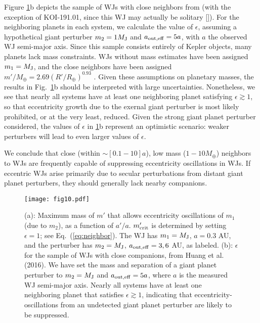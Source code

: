 \documentclass[12pt,useAMS, usenatbib]{mn2e}
\newcommand{\aouteff}{a_{\rm out,eff}}
\newcommand{\mjup}{M_{\rm J}}
\begin{document}
Figure \ref{fig:neighbor}b depicts the sample of WJs with close neighbors from \cite{huang2016} (with the exception of KOI-191.01, since this WJ may actually be solitary [\citealt{law2014}]).  For the neighboring planets in each system, we calculate the value of $\epsilon$, assuming a hypothetical giant perturber $m_2 = 1 \mjup$ and $\aouteff = 5 a$, with $a$ the observed WJ semi-major axis.  Since this sample consists entirely of Kepler objects, many planets lack mass constraints.  WJs without mass estimates have been assigned $m_1 = \mjup$, and the close neighbors have been assigned $m'/M_{\oplus} = 2.69 (R'/R_{\oplus})^{0.93}$ \citep{weiss2014}.  Given these assumptions on planetary masses, the results in Fig.~\ref{fig:neighbor}b should be interpreted with large uncertainties.  Nonetheless, we see that nearly all systems have at least one neighboring planet satisfying $\epsilon \gtrsim 1$, so that eccentricity growth due to the exernal giant perturber is most likely prohibited, or at the very least, reduced.  Given the strong giant planet perturber considered, the values of $\epsilon$ in \ref{fig:neighbor}b represent an optimistic scenario: weaker perturbers will lead to even larger values of $\epsilon$.

We conclude that close (within $\sim [0.1 - 10] a$), low mass ($1-10 M_{\oplus}$) neighbors to WJs are frequently capable of suppressing eccentricity oscillations in WJs.  If eccentric WJs arise primarily due to secular perturbations from distant giant planet perturbers, they should generally lack nearby companions.

\begin{figure*}
\centering 
\texttt{[image: fig10.pdf]}
\caption{(a): Maximum mass of $m'$ that allows eccentricity oscillations of $m_1$ (due to $m_2$), as a function of $a'/a$.  $m_{\rm crit}'$ is determined by setting $\epsilon = 1$; see Eq.~(\ref{eq:neighbor}).   The WJ has $m_1 = \mjup$, $a = 0.3$ AU, and the perturber has $m_2 = \mjup$, $\aouteff = 3, 6$ AU, as labeled. (b):  $\epsilon$ for the sample of WJs with close companions, from Huang et al. (2016).  We have set the mass and separation of a giant planet perturber to $m_2 = \mjup$ and $\aouteff = 5 a$, where $a$ is the measured WJ semi-major axis.  Nearly all systems have at least one neighboring planet that satisfies $\epsilon \gtrsim 1$, indicating that eccentricity-oscillations from an undetected giant planet perturber are likely to be suppressed.}
\label{fig:neighbor}
\end{figure*}
\end{document}
